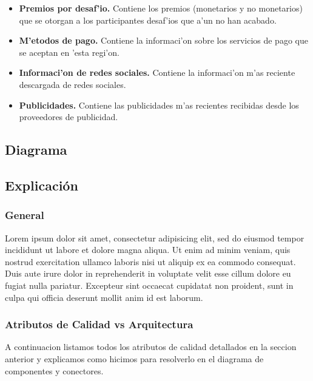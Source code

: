 \begin{itemize}
	\item \textbf{Premios por desaf'io.} Contiene los premios (monetarios y no monetarios) que se otorgan a los participantes desaf'ios que a'un no han acabado.
	\item \textbf{M'etodos de pago.} Contiene la informaci'on sobre los servicios de pago que se aceptan en 'esta regi'on.
	\item \textbf{Informaci'on de redes sociales.} Contiene la informaci'on m'as reciente descargada de redes sociales.
	\item \textbf{Publicidades.} Contiene las publicidades m'as recientes recibidas desde los proveedores de publicidad.
\end{itemize}

\subsection{Diagrama}
\subsection{Explicación}
\subsubsection{General}
Lorem ipsum dolor sit amet, consectetur adipisicing elit, sed do eiusmod
tempor incididunt ut labore et dolore magna aliqua. Ut enim ad minim veniam,
quis nostrud exercitation ullamco laboris nisi ut aliquip ex ea commodo
consequat. Duis aute irure dolor in reprehenderit in voluptate velit esse
cillum dolore eu fugiat nulla pariatur. Excepteur sint occaecat cupidatat non
proident, sunt in culpa qui officia deserunt mollit anim id est laborum.

\subsubsection{Atributos de Calidad vs Arquitectura}
A continuacion listamos todos los atributos de calidad detallados en la seccion anterior y explicamos como hicimos para resolverlo en el diagrama de componentes y conectores.

